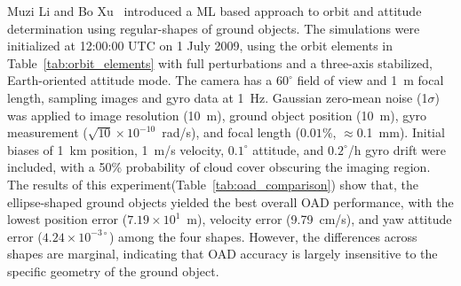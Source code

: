 \documentclass[conference]{IEEEtran}
\begin{document}
\begin{table}[H]
\renewcommand{\arraystretch}{1.2}
\caption{Comparison of OAD Performance Using Images of Four Regular-Shaped Objects}
\label{tab:oad_comparison}
\centering
{}
\end{table}

Muzi Li and Bo Xu~\cite{liAutonomousOrbitAttitude2018} introduced a \ac{ML} based approach to orbit and attitude determination using regular-shapes of ground objects. The simulations were initialized at 12:00:00 UTC on 1 July 2009, using the orbit elements in Table~\ref{tab:orbit_elements} with full perturbations and a three-axis stabilized, Earth-oriented attitude mode. The camera has a $60^{\circ}$ field of view and 1~m focal length, sampling images and gyro data at 1~Hz. Gaussian zero-mean noise (1$\sigma$) was applied to image resolution (10~m), ground object position (10~m), gyro measurement ($\sqrt{10} \times 10^{-10}$~rad/s), and focal length ($0.01\%$, $\approx$0.1~mm). Initial biases of 1~km position, 1~m/s velocity, $0.1^{\circ}$ attitude, and $0.2^{\circ}$/h gyro drift were included, with a 50\% probability of cloud cover obscuring the imaging region. The results of this experiment(Table~\ref{tab:oad_comparison}) show that, the ellipse-shaped ground objects yielded the best overall OAD performance, with the lowest position error ($7.19 \times 10^{1}$~m), velocity error (9.79~cm/s), and yaw attitude error ($4.24 \times 10^{-3\circ}$) among the four shapes. However, the differences across shapes are marginal, indicating that OAD accuracy is largely insensitive to the specific geometry of the ground object.







\end{document}
